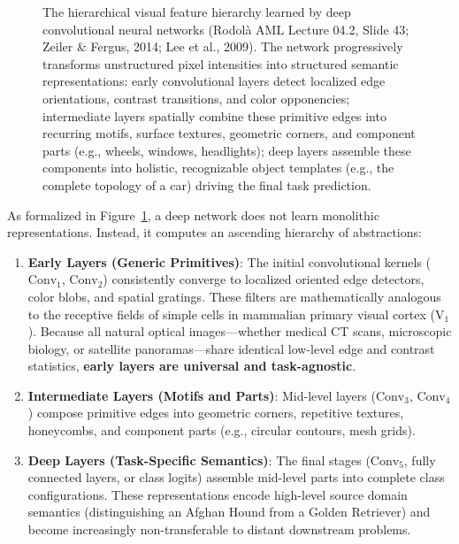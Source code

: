 \begin{figure}[H]
\begin{tikzpicture}
\end{tikzpicture}
\caption{The hierarchical visual feature hierarchy learned by deep convolutional neural networks (Rodol\`a AML Lecture 04.2, Slide 43; Zeiler \& Fergus, 2014; Lee et al., 2009). The network progressively transforms unstructured pixel intensities into structured semantic representations: early convolutional layers detect localized edge orientations, contrast transitions, and color opponencies; intermediate layers spatially combine these primitive edges into recurring motifs, surface textures, geometric corners, and component parts (e.g., wheels, windows, headlights); deep layers assemble these components into holistic, recognizable object templates (e.g., the complete topology of a car) driving the final task prediction.}
\label{fig:hierarchical_feature_spectrum}
\end{figure}

As formalized in Figure~\ref{fig:hierarchical_feature_spectrum}, a deep network does not learn monolithic representations. Instead, it computes an ascending hierarchy of abstractions:
\begin{enumerate}[leftmargin=*]
  \item \textbf{Early Layers (Generic Primitives)}: The initial convolutional kernels ($\text{Conv}_1$, $\text{Conv}_2$) consistently converge to localized oriented edge detectors, color blobs, and spatial gratings. These filters are mathematically analogous to the receptive fields of simple cells in mammalian primary visual cortex ($\text{V}_1$). Because all natural optical images—whether medical CT scans, microscopic biology, or satellite panoramas—share identical low-level edge and contrast statistics, \textbf{early layers are universal and task-agnostic}.
  \item \textbf{Intermediate Layers (Motifs and Parts)}: Mid-level layers ($\text{Conv}_3$, $\text{Conv}_4$) compose primitive edges into geometric corners, repetitive textures, honeycombs, and component parts (e.g., circular contours, mesh grids).
  \item \textbf{Deep Layers (Task-Specific Semantics)}: The final stages ($\text{Conv}_5$, fully connected layers, or class logits) assemble mid-level parts into complete class configurations. These representations encode high-level source domain semantics (distinguishing an Afghan Hound from a Golden Retriever) and become increasingly non-transferable to distant downstream problems.
\end{enumerate}

